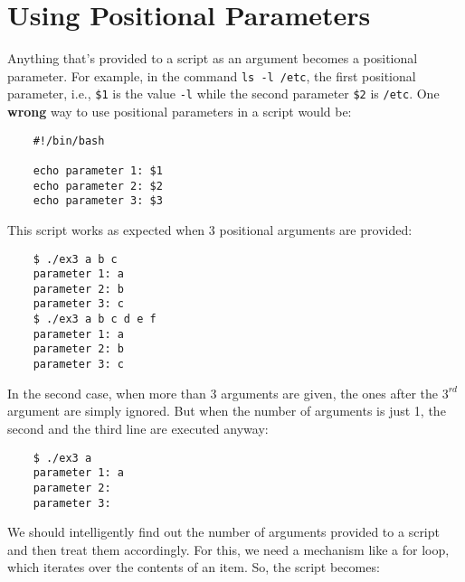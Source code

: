 
\usepackage{minted}
\usepackage{booktabs}


			
	
	\section{Using Positional Parameters}
	Anything that's provided to a script as an argument becomes a positional parameter. For example, in the command \verb|ls -l /etc|, the first positional parameter, i.e., \verb|$1| is the value \verb|-l| while the second parameter \verb|$2| is \verb|/etc|. One \textbf{wrong} way to use positional parameters in a script would be:
	
	\vspace{-15pt}
	\begin{verbatim}
	#!/bin/bash
	
	echo parameter 1: $1
	echo parameter 2: $2
	echo parameter 3: $3
	\end{verbatim}
	\vspace{-10pt}	
	
	\noindent
	This script works as expected when 3 positional arguments are provided: 
	
	\vspace{-15pt}
	\begin{verbatim}
	$ ./ex3 a b c 
	parameter 1: a
	parameter 2: b
	parameter 3: c
	$ ./ex3 a b c d e f
	parameter 1: a
	parameter 2: b
	parameter 3: c
	\end{verbatim}
	\vspace{-10pt}	
	
	\noindent
	In the second case, when more than 3 arguments are given, the ones after the $3^{rd}$ argument are simply ignored. But when the number of arguments is just 1, the second and the third line are executed anyway:
	
	\vspace{-15pt}
	\begin{verbatim}
	$ ./ex3 a 
	parameter 1: a
	parameter 2:
	parameter 3:
	\end{verbatim}
	\vspace{-10pt}	
	
	\noindent
	We should intelligently find out the number of arguments provided to a script and then treat them accordingly. For this, we need a mechanism like a for loop, which iterates over the contents of an item. So, the script becomes:
	
